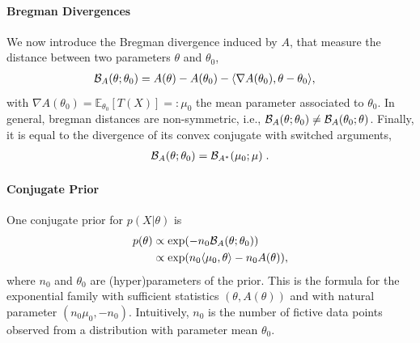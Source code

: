 \documentclass[twoside]{article}
\newcommand*{\expect}[2][]{\ensuremath{\mathbb{E}_{#1} \left[ #2 \right] }} %
\newcommand{\logpart}{A}
\newcommand{\bregman}{\cB_\logpart}
\newcommand{\bregmanconj}{\cB_{\logpart^*}}
\newcommand{\nat}{\theta}
\newcommand{\m}{\mu}
\newcommand{\meanp}{\m}
\begin{document}
\paragraph{Bregman Divergences} %
We now introduce the Bregman divergence induced by $\logpart$, that measure the distance between two parameters $\nat$ and $\nat_0$,
\begin{align}
    \bregman (\nat ; \nat_0)
    & = \logpart(\nat) - \logpart(\nat_0)
    - \langle \nabla \logpart(\nat_0)  , \nat - \nat_0 \rangle,
\end{align}
with $\nabla \logpart(\nat_0) = \expect[\nat_0]{T(X)} =: \meanp_0$ the mean parameter associated to $\nat_0$. In general, bregman distances are non-symmetric, i.e., $\bregman (\nat ; \nat_0)\neq \bregman (\nat_0 ; \nat)$. Finally, it is equal to the divergence of its convex conjugate with switched arguments,
\begin{align}
	\bregman (\nat ; \nat_0)
    = \bregmanconj ( \meanp_0 ; \meanp) \; .
\end{align}

\paragraph{Conjugate Prior}
One conjugate prior \citep{agarwal2010geometric} for $p(X|\nat)$ is
\begin{align}
    p(\nat)
    &\propto \exp( - n_0 \bregman(\nat ; \nat_0) ) \\
    &\propto \exp(n_0 \langle \m_0, \nat \rangle - n_0 \logpart(\nat)),
    \label{eq:def_prior}
\end{align}
where $n_0$ and $\nat_0$ are (hyper)parameters of the prior.
This is the formula for the exponential family with sufficient statistics $(\nat ,\logpart(\nat))$ and with natural parameter $(n_0 \m_0, -n_0)$.
Intuitively, $n_0$ is the number of fictive data points observed from a distribution with parameter mean $\nat_0$.
\end{document}
